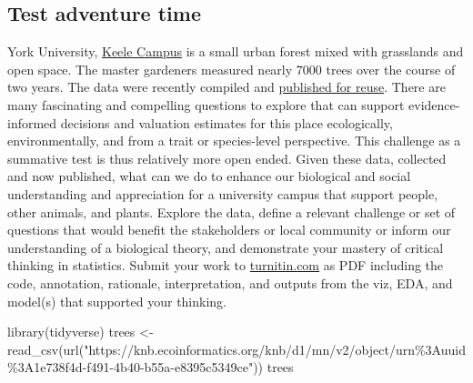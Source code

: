 \documentclass[
]{book}
\newenvironment{Shaded}{\begin{snugshade}}{\end{snugshade}}
\newcommand{\FunctionTok}[1]{\textcolor[rgb]{0.00,0.00,0.00}{#1}}
\newcommand{\NormalTok}[1]{#1}
\newcommand{\OtherTok}[1]{\textcolor[rgb]{0.56,0.35,0.01}{#1}}
\newcommand{\StringTok}[1]{\textcolor[rgb]{0.31,0.60,0.02}{#1}}
\begin{document}
\hypertarget{test-adventure-time}{%
\subsection*{Test adventure time}\label{test-adventure-time}}

York University, \href{https://en.wikipedia.org/wiki/Keele_Campus_(York_University)}{Keele Campus} is a small urban forest mixed with grasslands and open space. The master gardeners measured nearly 7000 trees over the course of two years. The data were recently compiled and \href{https://knb.ecoinformatics.org/view/doi\%3A10.5063\%2FF13F4MZC}{published for reuse}. There are many fascinating and compelling questions to explore that can support evidence-informed decisions and valuation estimates for this place ecologically, environmentally, and from a trait or species-level perspective. This challenge as a summative test is thus relatively more open ended. Given these data, collected and now published, what can we do to enhance our biological and social understanding and appreciation for a university campus that support people, other animals, and plants. Explore the data, define a relevant challenge or set of questions that would benefit the stakeholders or local community or inform our understanding of a biological theory, and demonstrate your mastery of critical thinking in statistics. Submit your work to \href{https://www.turnitin.com}{turnitin.com} as PDF including the code, annotation, rationale, interpretation, and outputs from the viz, EDA, and model(s) that supported your thinking.

\begin{Shaded}
\begin{Highlighting}[]
\FunctionTok{library}\NormalTok{(tidyverse)}
\NormalTok{trees }\OtherTok{\textless{}{-}} \FunctionTok{read\_csv}\NormalTok{(}\FunctionTok{url}\NormalTok{(}\StringTok{"https://knb.ecoinformatics.org/knb/d1/mn/v2/object/urn\%3Auuid\%3A1e738f4d{-}f491{-}4b40{-}b55a{-}e8395c5349ce"}\NormalTok{))  }
\NormalTok{trees}
\end{Highlighting}
\end{Shaded}
\end{document}
